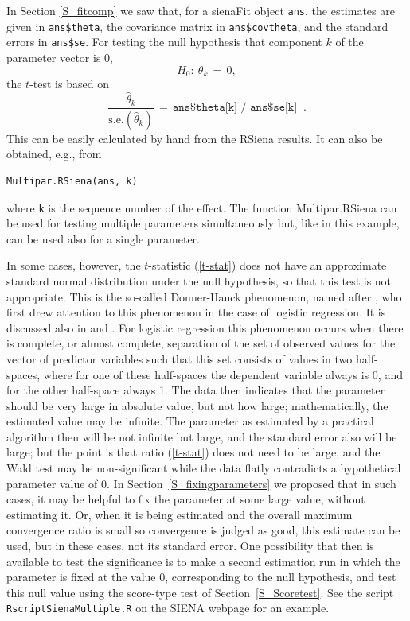 \documentclass[a4paper,fleqn,11pt]{article}
\newcommand{\+}{\, + \,}
\newcommand{\se}{\mbox{s.e.}}
\newcommand{\sfn}[1]{\textsf{#1}}
\newcommand{\RS}{{\sf \textsf{RSiena} }}
\newcommand{\SI}{{\sf SIENA }}
\begin{document}
In Section \ref{S_fitcomp} we saw that, for a \textsf{sienaFit}
object \texttt{ans}, the estimates are given in
\texttt{ans\$theta}, the covariance matrix in \texttt{ans\$covtheta},
and the standard errors in \texttt{ans\$se}.
For testing the null hypothesis that component $k$ of the parameter
vector is 0,
\[
H_0 : \ \theta_k \,=\, 0 ,
\]
the $t$-test is based on
\begin{equation}
\frac{\hat\theta_k}{\se(\hat\theta_k)} \,=\,
   \texttt{ans\$theta[k] / ans\$se[k] } \ .  \label{t-stat}
\end{equation}
This can be easily calculated by hand from the \RS results.
It can also be obtained, e.g., from
\begin{verbatim}
Multipar.RSiena(ans, k)
\end{verbatim}
where \texttt{k} is the sequence number of the effect.
The function \sfn{Multipar.RSiena} can be used for testing multiple
parameters simultaneously but, like in this example,
can be used also for a single parameter.
\medskip

In some cases, however, the $t$-statistic (\ref{t-stat}) does not have
an approximate standard normal distribution under the null hypothesis,
so that this test is not appropriate.
This is the so-called Donner-Hauck phenomenon, named after
\citet{HauckDonner77}, who first drew attention to this phenomenon
in the case of logistic regression. It is discussed also in
\citet[section 1.6]{GeyerThompson92} and \citet{AlbertAnderson84}.
For logistic regression this phenomenon occurs when there is complete,
or almost complete, separation of the set of observed values
for the vector of predictor variables such that this set
consists of values in two half-spaces,
where for one of these half-spaces the
dependent variable always is 0, and for the other half-space always 1.
The data then indicates that the parameter
should be very large in absolute value, but not how large;
mathematically, the estimated value may be infinite.
The parameter as estimated by a practical algorithm
then will be not infinite but large, and the standard error
also will be large;
but the point is that ratio (\ref{t-stat}) does not need to be large,
and the Wald test may be non-significant while
the data flatly contradicts a hypothetical parameter value of 0.
In Section~\ref{S_fixingparameters} we proposed that in such cases,
it may be helpful to fix the parameter at some large value,
without estimating it.
Or, when it is being estimated and the
overall maximum convergence ratio is
small so convergence is judged as good, this estimate can be used,
but in these cases, not its standard error.
One possibility that then is available to test the significance
is to make a second estimation run in which the parameter is fixed at
the value 0, corresponding to the null hypothesis, and test
this null value using the score-type test of Section~\ref{S_Scoretest}.
See the script \texttt{RscriptSienaMultiple.R} on the \SI webpage
for an example.
\end{document}
